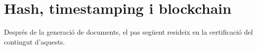 \section{Hash, timestamping i blockchain}
\label{arquitectura:hash_timestamping}
%
%
Després de la generació de documents, el pas següent resideix en la certificació del contingut d'aquests.\\
